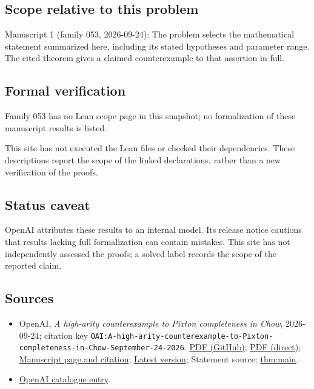 \documentclass[11pt]{article}
\begin{document}
\subsection{Scope relative to this problem}
Manuscript 1 (family 053, 2026-09-24): The problem selects the mathematical statement summarized here, including its stated hypotheses and parameter range. The cited theorem gives a claimed counterexample to that assertion in full.

\subsection{Formal verification}
Family 053 has no Lean scope page in this snapshot; no formalization of these manuscript results is listed.

This site has not executed the Lean files or checked their dependencies. These descriptions report the scope of the linked declarations, rather than a new verification of the proofs.

\subsection{Status caveat}
OpenAI attributes these results to an internal model. Its release notice cautions that results lacking full formalization can contain mistakes. This site has not independently assessed the proofs; a solved label records the scope of the reported claim.

\subsection{Sources}
\begin{itemize}
\item OpenAI, \emph{A high-arity counterexample to Pixton completeness in Chow}, 2026-09-24; citation key \texttt{OAI:A-high-arity-counterexample-to-Pixton-completeness-in-Chow-September-24-2026}. \href{https://github.com/openai/math/blob/adc7f1241b42e322a6451854ab7e4b4c146bf78a/preprints/A-high-arity-counterexample-to-Pixton-completeness-in-Chow-September-24-2026/paper.pdf}{PDF (GitHub)}; \href{https://github.com/openai/math/raw/adc7f1241b42e322a6451854ab7e4b4c146bf78a/preprints/A-high-arity-counterexample-to-Pixton-completeness-in-Chow-September-24-2026/paper.pdf}{PDF (direct)}; \href{https://github.com/openai/math/blob/adc7f1241b42e322a6451854ab7e4b4c146bf78a/preprints/A-high-arity-counterexample-to-Pixton-completeness-in-Chow-September-24-2026/README.md}{Manuscript page and citation}; \href{https://github.com/openai/math/blob/main/preprints/A-high-arity-counterexample-to-Pixton-completeness-in-Chow-September-24-2026/paper.pdf}{Latest version}; Statement source: \href{https://github.com/openai/math/blob/adc7f1241b42e322a6451854ab7e4b4c146bf78a/preprints/A-high-arity-counterexample-to-Pixton-completeness-in-Chow-September-24-2026/build/sections/01-introduction.tex\#L76}{thm:main}.
\item \href{https://github.com/openai/math/blob/adc7f1241b42e322a6451854ab7e4b4c146bf78a/CONTENTS.md}{OpenAI catalogue entry}.
\end{itemize}
\end{document}
